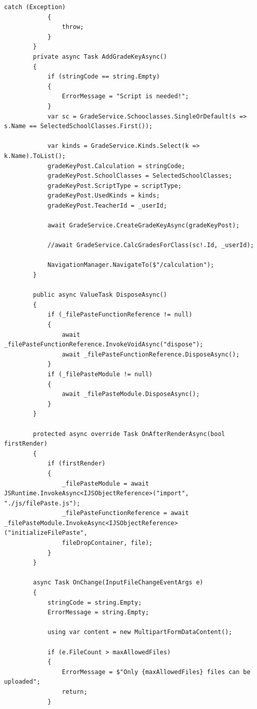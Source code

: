 \begin{lstlisting}[language={[Sharp]C}, caption=Code for FileUpload, label=lst:imp:fu]
            catch (Exception)
            {
                throw;
            }
        }
        private async Task AddGradeKeyAsync()
        {
            if (stringCode == string.Empty)
            {
                ErrorMessage = "Script is needed!";
            }
            var sc = GradeService.Schooclasses.SingleOrDefault(s => s.Name == SelectedSchoolClasses.First());
    
            var kinds = GradeService.Kinds.Select(k => k.Name).ToList();
            gradeKeyPost.Calculation = stringCode;
            gradeKeyPost.SchoolClasses = SelectedSchoolClasses;
            gradeKeyPost.ScriptType = scriptType;
            gradeKeyPost.UsedKinds = kinds;
            gradeKeyPost.TeacherId = _userId;
            
            await GradeService.CreateGradeKeyAsync(gradeKeyPost);
    
            //await GradeService.CalcGradesForClass(sc!.Id, _userId);
    
            NavigationManager.NavigateTo($"/calculation");
        }
    
        public async ValueTask DisposeAsync()
        {
            if (_filePasteFunctionReference != null)
            {
                await _filePasteFunctionReference.InvokeVoidAsync("dispose");
                await _filePasteFunctionReference.DisposeAsync();
            }
            if (_filePasteModule != null)
            {
                await _filePasteModule.DisposeAsync();
            }
        }
    
        protected async override Task OnAfterRenderAsync(bool firstRender)
        {
            if (firstRender)
            {
                _filePasteModule = await JSRuntime.InvokeAsync<IJSObjectReference>("import", "./js/filePaste.js");
                _filePasteFunctionReference = await _filePasteModule.InvokeAsync<IJSObjectReference>("initializeFilePaste",
                fileDropContainer, file);
            }
        }
    
        async Task OnChange(InputFileChangeEventArgs e)
        {
            stringCode = string.Empty;
            ErrorMessage = string.Empty;
    
            using var content = new MultipartFormDataContent();
    
            if (e.FileCount > maxAllowedFiles)
            {
                ErrorMessage = $"Only {maxAllowedFiles} files can be uploaded";
                return;
            }
    

\end{lstlisting}
